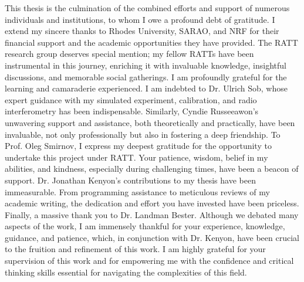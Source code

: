 \documentclass[
11pt, %
english, %
onehalfspacing, %
headsepline, %
]{RhodesThesis} %
\theoremstyle{customdefstyle}
\begin{document}

\begin{acknowledgements}
  \addchaptertocentry{\acknowledgementname} %
  This thesis is the culmination of the combined efforts and support of numerous individuals and institutions, to whom I owe a profound debt of gratitude. I extend my sincere thanks to Rhodes University, \acrshort{SARAO}, and NRF for their financial support and the academic opportunities they have provided. The RATT research group deserves special mention; my fellow RATTs have been instrumental in this journey, enriching it with invaluable knowledge, insightful discussions, and memorable social gatherings. I am profoundly grateful for the learning and camaraderie experienced. I am indebted to Dr. Ulrich Sob, whose expert guidance with my simulated experiment, calibration, and radio interferometry has been indispensable. Similarly, Cyndie Russeeawon's unwavering support and assistance, both theoretically and practically, have been invaluable, not only professionally but also in fostering a deep friendship. To Prof. Oleg Smirnov, I express my deepest gratitude for the opportunity to undertake this project under RATT. Your patience, wisdom, belief in my abilities, and kindness, especially during challenging times, have been a beacon of support. Dr. Jonathan Kenyon's contributions to my thesis have been immeasurable. From programming assistance to meticulous reviews of my academic writing, the dedication and effort you have invested have been priceless. Finally, a massive thank you to Dr. Landman Bester. Although we debated many aspects of the work, I am immensely thankful for your experience, knowledge, guidance, and patience, which, in conjunction with Dr. Kenyon, have been crucial to the fruition and refinement of this work. I am highly grateful for your supervision of this work and for empowering me with the confidence and critical thinking skills essential for navigating the complexities of this field.


\end{acknowledgements}
\end{document}

